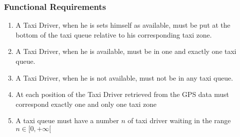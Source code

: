 \subsubsection{Functional Requirements}
\begin{enumerate}
\item A Taxi Driver, when he is sets himself as available, must be put at the bottom of the taxi queue relative to his corresponding taxi zone.
\item A Taxi Driver, when he is available, must be in one and exactly one taxi queue.
\item A Taxi Driver, when he is not available, must not be in any taxi queue.
\item At each position of the Taxi Driver retrieved from the GPS data must correspond exactly one and only one taxi zone
\item A taxi queue must have a number $n$ of taxi driver waiting in the range $n\in[0,+\infty[$
\end{enumerate}